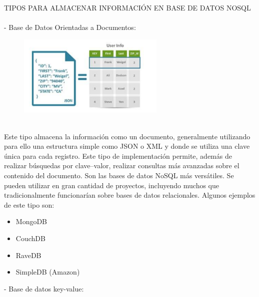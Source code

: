 \documentclass[%
 reprint,
 amsmath,amssymb,
 aps,
]{revtex4-1}
\begin{document}
           \par TIPOS PARA ALMACENAR INFORMACIÓN EN BASE DE DATOS NOSQL
\\        
\\  
  -  Base de Datos Orientadas a Documentos:
\\
           \begin{figure}[htb]
	\begin{center}
	\includegraphics[width=7cm]{./Imagenes/1}
	\end{center}
	\end{figure}
\\
 Este tipo almacena la información como un documento, generalmente utilizando para ello una estructura simple como JSON o XML y donde se utiliza una clave única para cada registro. Este tipo de implementación permite, además de realizar búsquedas por clave–valor, realizar consultas más avanzadas sobre el contenido del documento.  
Son las bases de datos NoSQL más versátiles. Se pueden utilizar en gran cantidad de proyectos, incluyendo muchos que tradicionalmente funcionarían sobre bases de datos relacionales. \cite{TiposNoSQL}
Algunos ejemplos de este tipo son:
           \begin{itemize}
		\item MongoDB
		\item CouchDB
		\item RaveDB
		\item SimpleDB (Amazon)
	\end{itemize}

 -  Base de datos key-value:
\\
\\
\end{document}
